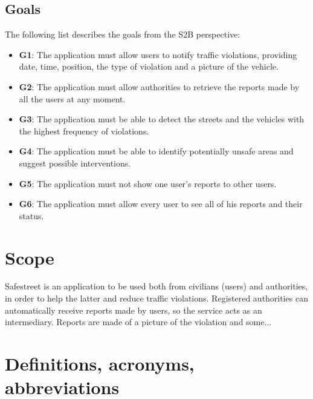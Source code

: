 \documentclass[12pt,a4paper]{report}
\begin{document}
		\subsection{Goals}
The following list describes the goals from the S2B perspective:

\begin{itemize}
	\item \textbf{G1}: The application must allow users to notify traffic violations, providing date, time, position, the type of violation and a picture of the vehicle.
  	\item \textbf{G2}: The application must allow authorities to retrieve the reports made by all the users at any moment.
	\item \textbf{G3}: The application must be able to detect the streets and the vehicles with the highest frequency of violations.
	\item \textbf{G4}: The application must be able to identify potentially unsafe areas and suggest possible interventions.
	\item \textbf{G5}: The application must not show one user's reports to other users.
	\item \textbf{G6}: The application must allow every user to see all of his reports and their status.
\end{itemize}

	\section{Scope}
Safestreet is an application to be used both from civilians (users) and authorities, in order to help the latter and reduce traffic violations. Registered authorities can automatically receive reports made by users, so the service acts as an intermediary. Reports are made of a picture of the violation and some... 

	\section{Definitions, acronyms, abbreviations}
\end{document}
